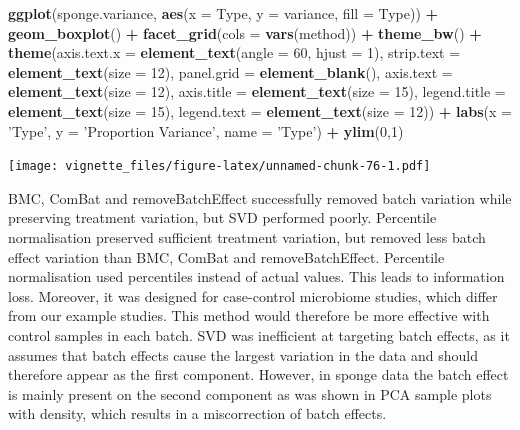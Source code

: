\documentclass[]{book}
\newenvironment{Shaded}{\begin{snugshade}}{\end{snugshade}}
\newcommand{\KeywordTok}[1]{\textcolor[rgb]{0.13,0.29,0.53}{\textbf{#1}}}
\newcommand{\DataTypeTok}[1]{\textcolor[rgb]{0.13,0.29,0.53}{#1}}
\newcommand{\DecValTok}[1]{\textcolor[rgb]{0.00,0.00,0.81}{#1}}
\newcommand{\StringTok}[1]{\textcolor[rgb]{0.31,0.60,0.02}{#1}}
\newcommand{\OperatorTok}[1]{\textcolor[rgb]{0.81,0.36,0.00}{\textbf{#1}}}
\newcommand{\NormalTok}[1]{#1}
\begin{document}
\begin{Shaded}
\begin{Highlighting}[]
\KeywordTok{ggplot}\NormalTok{(sponge.variance, }\KeywordTok{aes}\NormalTok{(}\DataTypeTok{x =}\NormalTok{ Type, }\DataTypeTok{y =}\NormalTok{ variance, }\DataTypeTok{fill =}\NormalTok{ Type)) }\OperatorTok{+}\StringTok{ }
\StringTok{  }\KeywordTok{geom_boxplot}\NormalTok{() }\OperatorTok{+}\StringTok{ }\KeywordTok{facet_grid}\NormalTok{(}\DataTypeTok{cols =} \KeywordTok{vars}\NormalTok{(method)) }\OperatorTok{+}\StringTok{ }\KeywordTok{theme_bw}\NormalTok{() }\OperatorTok{+}\StringTok{ }
\StringTok{  }\KeywordTok{theme}\NormalTok{(}\DataTypeTok{axis.text.x =} \KeywordTok{element_text}\NormalTok{(}\DataTypeTok{angle =} \DecValTok{60}\NormalTok{, }\DataTypeTok{hjust =} \DecValTok{1}\NormalTok{), }
        \DataTypeTok{strip.text =} \KeywordTok{element_text}\NormalTok{(}\DataTypeTok{size =} \DecValTok{12}\NormalTok{), }\DataTypeTok{panel.grid =} \KeywordTok{element_blank}\NormalTok{(), }
        \DataTypeTok{axis.text =} \KeywordTok{element_text}\NormalTok{(}\DataTypeTok{size =} \DecValTok{12}\NormalTok{), }\DataTypeTok{axis.title =} \KeywordTok{element_text}\NormalTok{(}\DataTypeTok{size =} \DecValTok{15}\NormalTok{), }
        \DataTypeTok{legend.title =} \KeywordTok{element_text}\NormalTok{(}\DataTypeTok{size =} \DecValTok{15}\NormalTok{), }\DataTypeTok{legend.text =} \KeywordTok{element_text}\NormalTok{(}\DataTypeTok{size =} \DecValTok{12}\NormalTok{)) }\OperatorTok{+}\StringTok{ }
\StringTok{  }\KeywordTok{labs}\NormalTok{(}\DataTypeTok{x =} \StringTok{'Type'}\NormalTok{, }\DataTypeTok{y =} \StringTok{'Proportion Variance'}\NormalTok{, }\DataTypeTok{name =} \StringTok{'Type'}\NormalTok{) }\OperatorTok{+}\StringTok{ }\KeywordTok{ylim}\NormalTok{(}\DecValTok{0}\NormalTok{,}\DecValTok{1}\NormalTok{)}
\end{Highlighting}
\end{Shaded}

\texttt{[image: vignette\_files/figure-latex/unnamed-chunk-76-1.pdf]}

BMC, ComBat and removeBatchEffect successfully removed batch variation
while preserving treatment variation, but SVD performed poorly.
Percentile normalisation preserved sufficient treatment variation, but
removed less batch effect variation than BMC, ComBat and
removeBatchEffect. Percentile normalisation used percentiles instead of
actual values. This leads to information loss. Moreover, it was designed
for case-control microbiome studies, which differ from our example
studies. This method would therefore be more effective with control
samples in each batch. SVD was inefficient at targeting batch effects,
as it assumes that batch effects cause the largest variation in the data
and should therefore appear as the first component. However, in sponge
data the batch effect is mainly present on the second component as was
shown in PCA sample plots with density, which results in a miscorrection
of batch effects.
\end{document}
